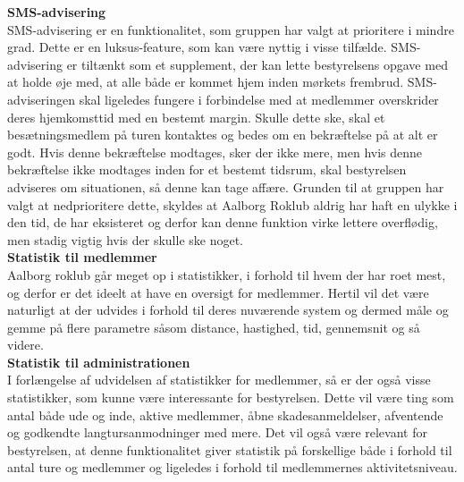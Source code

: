 
{\bf{SMS-advisering}}\\
SMS-advisering er en funktionalitet, som gruppen har valgt at prioritere i mindre grad. Dette er en luksus-feature, som kan være nyttig i visse tilfælde.
SMS-advisering er tiltænkt som et supplement, der kan lette bestyrelsens opgave med at holde øje med, at alle både er kommet hjem inden mørkets frembrud.
SMS-adviseringen skal ligeledes fungere i forbindelse med at medlemmer overskrider deres hjemkomsttid med en bestemt margin. Skulle dette ske, skal et besætningsmedlem på turen kontaktes og bedes om en bekræftelse på at alt er godt. Hvis denne bekræftelse modtages, sker der ikke mere, men hvis denne bekræftelse ikke modtages inden for et bestemt tidsrum, skal bestyrelsen adviseres om situationen, så denne kan tage affære. Grunden til at gruppen har valgt at nedprioritere dette, skyldes at Aalborg Roklub aldrig har haft en ulykke i den tid, de har eksisteret og derfor kan denne funktion virke lettere overflødig, men stadig vigtig hvis der skulle ske noget.\\

\textbf{Statistik til medlemmer}\\
Aalborg roklub går meget op i statistikker, i forhold til hvem der har roet mest, og derfor er det ideelt at have en oversigt for medlemmer. Hertil vil det være naturligt at der udvides i forhold til deres nuværende system og dermed måle og gemme på flere parametre såsom distance, hastighed, tid, gennemsnit og så videre. \\

\textbf{Statistik til administrationen}\\
I forlængelse af udvidelsen af statistikker for medlemmer, så er der også visse statistikker, som kunne være interessante for bestyrelsen. Dette vil være ting som antal både ude og inde, aktive medlemmer, åbne skadesanmeldelser, afventende og godkendte langtursanmodninger med mere. Det vil også være relevant for bestyrelsen, at denne funktionalitet giver statistik på forskellige både i forhold til antal ture og medlemmer og ligeledes i forhold til medlemmernes aktivitetsniveau.\\

